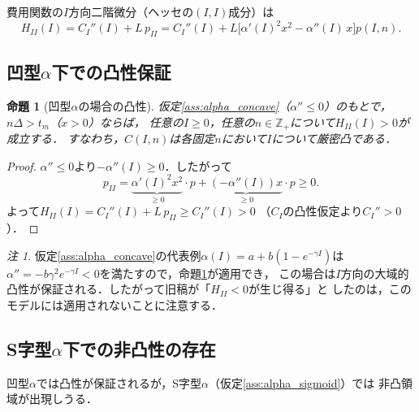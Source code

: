 \documentclass[12pt,a4paper]{article}
\theoremstyle{plain}
\newtheorem{proposition}[theorem]{命題}
\theoremstyle{definition}
\theoremstyle{remark}
\newtheorem{remark}[theorem]{注}
\newcommand{\Z}{\mathbb{Z}}
\begin{document}
費用関数の$I$方向二階微分（ヘッセの$(I,I)$成分）は
\begin{equation}\label{eq:H_II}
  H_{II}(I) = C_I''(I) + L\,p_{II}
  = C_I''(I) + L\bigl[\alpha'(I)^2 x^2 - \alpha''(I)\,x\bigr]p(I,n).
\end{equation}

\subsection{凹型$\alpha$下での凸性保証}

\begin{proposition}[凹型$\alpha$の場合の凸性]\label{prop:convex_alpha}
仮定\ref{ass:alpha_concave}（$\alpha'' \le 0$）のもとで，$n\Delta > t_m$（$x > 0$）ならば，
任意の$I \ge 0$，任意の$n \in \Z_+$について$H_{II}(I) > 0$が成立する．
すなわち，$C(I,n)$は各固定$n$において$I$について厳密凸である．
\end{proposition}

\begin{proof}
$\alpha'' \le 0$より$-\alpha''(I) \ge 0$．したがって
\[
  p_{II} = \underbrace{\alpha'(I)^2 x^2}_{\ge 0} \cdot p
         + \underbrace{(-\alpha''(I)) x}_{\ge 0} \cdot p \ge 0.
\]
よって$H_{II}(I) = C_I''(I) + L\,p_{II} \ge C_I''(I) > 0$
（$C_I$の凸性仮定より$C_I'' > 0$）．
\end{proof}

\begin{remark}
仮定\ref{ass:alpha_concave}の代表例$\alpha(I) = a + b(1-e^{-\gamma I})$は
$\alpha'' = -b\gamma^2 e^{-\gamma I} < 0$を満たすので，命題\ref{prop:convex_alpha}が適用でき，
この場合は$I$方向の大域的凸性が保証される．したがって旧稿が「$H_{II} < 0$が生じ得る」と
したのは，このモデルには適用されないことに注意する．
\end{remark}

\subsection{S字型$\alpha$下での非凸性の存在}

凹型$\alpha$では凸性が保証されるが，S字型$\alpha$（仮定\ref{ass:alpha_sigmoid}）では
非凸領域が出現しうる．
\end{document}

